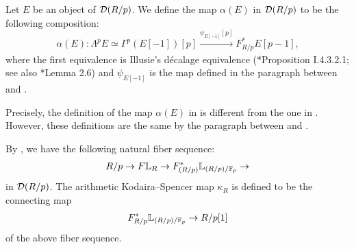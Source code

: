 \documentclass[11pt,a4paper]{amsart}
\begin{document}
\begin{construction}\label{construction2.10new}
    Let $E$ be an object of $\mathcal{D}(R/p)$. We define the map $\alpha(E)$ in $\mathcal{D}(R/p)$ to be the following composition:
    \[\alpha(E):\Lambda^pE\simeq \Gamma^p(E[-1])[p]\xrightarrow[]{\psi_{E[-1]}[p]}F^*_{R/p}E[p-1],\] where the first equivalence is Illusie's d\'{e}calage equivalence (\cite{illusie1971Complexe}*{Proposition I.4.3.2.1}; see also \cite{petrov2025Nondecomposability}*{Lemma 2.6}) and $\psi_{E[-1]}$ is the map defined in the paragraph between \cite[Lemma 2.5]{petrov2025Nondecomposability} and \cite[Lemma 2.6]{petrov2025Nondecomposability}.
\end{construction}
\begin{remark}
    Precisely, the definition of the map $\alpha(E)$ in \cite{petrov2025Nondecomposability} is different from the one in . However, these definitions are the same by the paragraph between \cite[Definition 3.4]{petrov2025Nondecomposability} and \cite[Remark 3.5]{petrov2025Nondecomposability}.
\end{remark}
\begin{construction}\label{construction2.11new}
    By \cite[Theorem 5.3]{shimada2026FrobeniusWitt}, we have the following natural fiber sequence:
    \[R/p\to F\mathbb{L}_R\to F^*_{(R/p)}\mathbb{L}_{(R/p)/\mathbb{F}_p}\to \] in $\mathcal{D}(R/p)$. The arithmetic Kodaira--Spencer map $\kappa_R$ is defined to be the connecting map \[F^*_{R/p}\mathbb{L}_{(R/p)/\mathbb{F}_p}\to R/p[1]\] of the above fiber sequence.
\end{construction}
\end{document}
